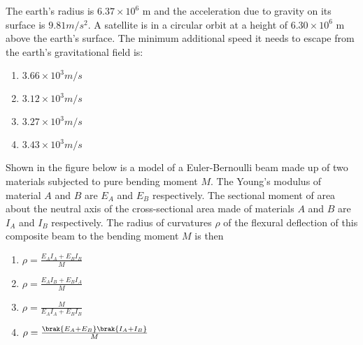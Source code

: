\item The earth's radius is $6.37 \times 10^6$ m and the acceleration due to gravity on its surface
is $9.81 m/s^2$. A satellite is in a circular orbit at a height of $6.30 \times 10^6$ m above the
earth's surface. The minimum additional speed it needs to escape from the earth's gravitational field is:
\begin{multicols}{2}
    \begin{enumerate}
        \item $3.66 \times 10^3 m/s$
        \item $3.12 \times 10^3 m/s$
        \item $3.27 \times 10^3 m/s$
        \item $3.43 \times 10^3 m/s$
    \end{enumerate}
\end{multicols}

\item Shown in the figure below is a model of a Euler-Bernoulli beam made up of two
materials subjected to pure bending moment $M$. The Young's modulus of material $A$
and $B$ are $E_A$ and $E_B$ respectively. The sectional moment of area about the neutral
axis of the cross-sectional area made of materials $A$ and $B$ are $I_A$ and $I_B$
respectively. The radius of curvatures $\rho$ of the flexural deflection of
this composite beam to the bending moment $M$ is then

\begin{center}    
\end{center}

\begin{multicols}{4}
    \begin{enumerate}
        \item $\rho = \frac{E_AI_A + E_BI_B}{M}$
        \item $\rho = \frac{E_AI_B + E_BI_A}{M}$
        \item $\rho = \frac{M}{E_AI_A + E_BI_B}$
        \item $\rho = \frac{\brak{E_A + E_B}\brak{I_A + I_B}}{M}$
    \end{enumerate}
\end{multicols}

